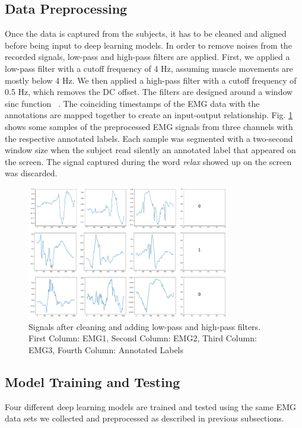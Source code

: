 \documentclass{article}
\begin{document}
\subsection{Data Preprocessing}
\label{ssec:Cleaning Data}
Once the data is captured from the subjects, it has to be cleaned and aligned before being input to deep learning models. In order to remove noises from the recorded signals, low-pass and high-pass filters are applied. %
First, we applied a low-pass filter with a cutoff frequency of 4 Hz, assuming  muscle movements are mostly below 4 Hz. We then applied a high-pass filter with a cutoff frequency of 0.5 Hz, which removes the DC offset. The filters are designed around a window sinc function ~\cite{noauthor_how_nodate}. The coinciding timestamps of the EMG data with the annotations are mapped together to create an input-output relationship. Fig. \ref{fig: cleaned_signals} shows some samples of the preprocessed EMG signals from three channels with the respective annotated labels. Each sample was segmented with a two-second window size when the subject read silently an annotated label that appeared on the screen. The signal captured during the word \textit{relax} showed up on the screen was discarded. 

\begin{figure}[!t]
\centering
\includegraphics[width=3.5in]{images/cleaned_signals.png}
\caption{Signals after cleaning and adding low-pass and high-pass filters. First Column: EMG1, Second Column: EMG2, Third Column: EMG3, Fourth Column: Annotated Labels}
\label{fig: cleaned_signals}
\end{figure}

\subsection{Model Training and Testing}
\label{ssec:Experimental models}
Four different deep learning models are trained and tested using the same EMG data sets we collected and preprocessed as described in previous subsections.  
\end{document}
